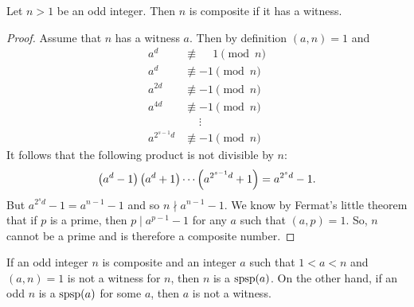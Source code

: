\documentclass{subfiles}
\begin{document}
		\begin{theorem}
			Let $n>1$ be an odd integer. Then $n$ is composite if it has a witness.
		\end{theorem}

		\begin{proof}
			Assume that $n$ has a witness $a$. Then by definition $(a,n)=1$ and
				\begin{align*}
					a^d &\not \equiv \phantom{-}1 \pmod n\\
					a^d &\not \equiv -1 \pmod n\\
					a^{2d} &\not \equiv -1 \pmod n\\
					a^{4d} &\not \equiv -1 \pmod n\\
					&\phantom{\equiv}\vdots\\
					a^{2^{s-1}d} &\not \equiv -1 \pmod n
				\end{align*}
			It follows that the following product is not divisible by $n$:
				\begin{align*}
					\left(a^d-1\right)\func{}{a^d+1}\cdots \func{}{a^{2^{s-1}d}+1} = a^{2^sd}-1.
				\end{align*}
			But $a^{2^sd}-1=a^{n-1}-1$ and so $n\nmid a^{n-1}-1$. We know by Fermat's little theorem that if $p$ is a prime, then $p\mid a^{p-1}-1$ for any $a$ such that $(a,p)=1$. So, $n$ cannot be a prime and is therefore a composite number.
		\end{proof}

		\begin{note}
			If an odd integer $n$ is composite and an integer $a$ such that $1<a<n$ and $(a,n)=1$ is not a witness for $n$, then $n$ is a $\operatorname{spsp}(a)$. On the other hand, if an odd $n$ is a $\operatorname{spsp}(a)$ for some $a$, then $a$ is not a witness.
		\end{note}
\end{document}
